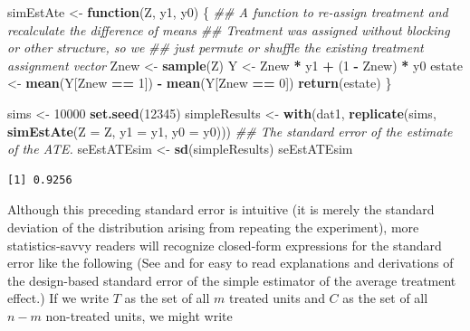 \documentclass[
  12pt,
]{book}
\newenvironment{Shaded}{\begin{snugshade}}{\end{snugshade}}
\newcommand{\CommentTok}[1]{\textcolor[rgb]{0.56,0.35,0.01}{\textit{#1}}}
\newcommand{\ControlFlowTok}[1]{\textcolor[rgb]{0.13,0.29,0.53}{\textbf{#1}}}
\newcommand{\DataTypeTok}[1]{\textcolor[rgb]{0.13,0.29,0.53}{#1}}
\newcommand{\DecValTok}[1]{\textcolor[rgb]{0.00,0.00,0.81}{#1}}
\newcommand{\KeywordTok}[1]{\textcolor[rgb]{0.13,0.29,0.53}{\textbf{#1}}}
\newcommand{\NormalTok}[1]{#1}
\newcommand{\OperatorTok}[1]{\textcolor[rgb]{0.81,0.36,0.00}{\textbf{#1}}}
\newcommand{\StringTok}[1]{\textcolor[rgb]{0.31,0.60,0.02}{#1}}
\theoremstyle{definition}
\theoremstyle{definition}
\theoremstyle{definition}
\theoremstyle{remark}
\begin{document}
\begin{Shaded}
\begin{Highlighting}[]
\NormalTok{simEstAte <-}\StringTok{ }\ControlFlowTok{function}\NormalTok{(Z, y1, y0) \{}
  \CommentTok{## A function to re-assign treatment and recalculate the difference of means}
  \CommentTok{## Treatment was assigned without blocking or other structure, so we}
  \CommentTok{## just permute or shuffle the existing treatment assignment vector}
\NormalTok{  Znew <-}\StringTok{ }\KeywordTok{sample}\NormalTok{(Z)}
\NormalTok{  Y <-}\StringTok{ }\NormalTok{Znew }\OperatorTok{*}\StringTok{ }\NormalTok{y1 }\OperatorTok{+}\StringTok{ }\NormalTok{(}\DecValTok{1} \OperatorTok{-}\StringTok{ }\NormalTok{Znew) }\OperatorTok{*}\StringTok{ }\NormalTok{y0}
\NormalTok{  estate <-}\StringTok{ }\KeywordTok{mean}\NormalTok{(Y[Znew }\OperatorTok{==}\StringTok{ }\DecValTok{1}\NormalTok{]) }\OperatorTok{-}\StringTok{ }\KeywordTok{mean}\NormalTok{(Y[Znew }\OperatorTok{==}\StringTok{ }\DecValTok{0}\NormalTok{])}
  \KeywordTok{return}\NormalTok{(estate)}
\NormalTok{\}}
\end{Highlighting}
\end{Shaded}

\begin{Shaded}
\begin{Highlighting}[]
\NormalTok{sims <-}\StringTok{ }\DecValTok{10000}
\KeywordTok{set.seed}\NormalTok{(}\DecValTok{12345}\NormalTok{)}
\NormalTok{simpleResults <-}\StringTok{ }\KeywordTok{with}\NormalTok{(dat1, }\KeywordTok{replicate}\NormalTok{(sims, }\KeywordTok{simEstAte}\NormalTok{(}\DataTypeTok{Z =}\NormalTok{ Z, }\DataTypeTok{y1 =}\NormalTok{ y1, }\DataTypeTok{y0 =}\NormalTok{ y0)))}
\CommentTok{## The standard error of the estimate of the ATE.}
\NormalTok{seEstATEsim <-}\StringTok{ }\KeywordTok{sd}\NormalTok{(simpleResults)}
\NormalTok{seEstATEsim}
\end{Highlighting}
\end{Shaded}

\begin{verbatim}
[1] 0.9256
\end{verbatim}

Although this preceding standard error is intuitive (it is merely the
standard deviation of the distribution arising from repeating the
experiment), more statistics-savvy readers will recognize closed-form
expressions for the standard error like the following (See
\citet{gerber_field_2012} and \citet{dunning_natural_2012} for easy to
read explanations and derivations of the design-based standard error of
the simple estimator of the average treatment effect.) If we write \(T\)
as the set of all \(m\) treated units and \(C\) as the set of all
\(n-m\) non-treated units, we might write
\end{document}
